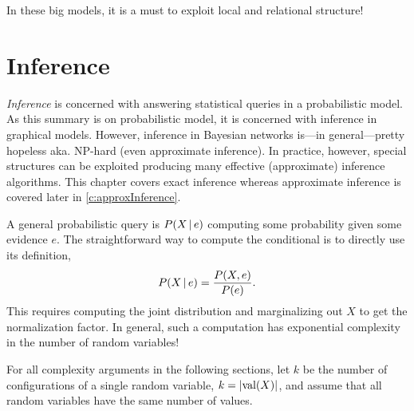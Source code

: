 		In these big models, it is a must to exploit local and relational structure!

\chapter{Inference}
	\label{c:inference}

	\emph{Inference} is concerned with answering statistical queries in a probabilistic model. As this summary is on probabilistic model, it is concerned with inference in graphical models. However, inference in Bayesian networks is---in general---pretty hopeless aka. NP-hard (even approximate inference). In practice, however, special structures can be exploited producing many effective (approximate) inference algorithms. This chapter covers exact inference whereas approximate inference is covered later in \autoref{c:approxInference}.

	A general probabilistic query is \( P(X \,\vert\, e) \) computing some probability given some evidence \(e\). The straightforward way to compute the conditional is to directly use its definition,
	\begin{equation}
		P(X \,\vert\, e) = \frac{P(X, e)}{P(e)}.
	\end{equation}
	This requires computing the joint distribution and marginalizing out \(X\) to get the normalization factor. In general, such a computation has exponential complexity in the number of random variables!

	For all complexity arguments in the following sections, let \(k\) be the number of configurations of a single random variable, \( k = \lvert \operatorname{val}(X) \rvert \), and assume that all random variables have the same number of values.

